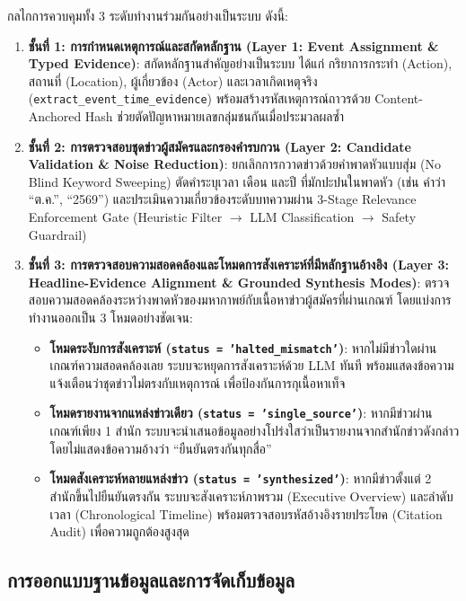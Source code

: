 กลไกการควบคุมทั้ง 3 ระดับทำงานร่วมกันอย่างเป็นระบบ ดังนี้:
\begin{enumerate}
    \item \textbf{ชั้นที่ 1: การกำหนดเหตุการณ์และสกัดหลักฐาน (Layer 1: Event Assignment \& Typed Evidence)}: สกัดหลักฐานสำคัญอย่างเป็นระบบ ได้แก่ กริยาการกระทำ (Action), สถานที่ (Location), ผู้เกี่ยวข้อง (Actor) และเวลาเกิดเหตุจริง (\texttt{extract\_event\_time\_evidence}) พร้อมสร้างรหัสเหตุการณ์ถาวรด้วย Content-Anchored Hash ช่วยตัดปัญหาหมายเลขกลุ่มชนกันเมื่อประมวลผลซ้ำ
    \item \textbf{ชั้นที่ 2: การตรวจสอบชุดข่าวผู้สมัครและกรองคำรบกวน (Layer 2: Candidate Validation \& Noise Reduction)}: ยกเลิกการกวาดข่าวด้วยคำพาดหัวแบบสุ่ม (No Blind Keyword Sweeping) ตัดคำระบุเวลา เดือน และปี ที่มักปะปนในพาดหัว (เช่น คำว่า ``ต.ค.'', ``2569'') และประเมินความเกี่ยวข้องระดับบทความผ่าน 3-Stage Relevance Enforcement Gate (Heuristic Filter $\rightarrow$ LLM Classification $\rightarrow$ Safety Guardrail)
    \item \textbf{ชั้นที่ 3: การตรวจสอบความสอดคล้องและโหมดการสังเคราะห์ที่มีหลักฐานอ้างอิง (Layer 3: Headline-Evidence Alignment \& Grounded Synthesis Modes)}: ตรวจสอบความสอดคล้องระหว่างพาดหัวของมหากาพย์กับเนื้อหาข่าวผู้สมัครที่ผ่านเกณฑ์ โดยแบ่งการทำงานออกเป็น 3 โหมดอย่างชัดเจน:
    \begin{itemize}
        \item \textbf{โหมดระงับการสังเคราะห์ (\texttt{status = 'halted\_mismatch'})}: หากไม่มีข่าวใดผ่านเกณฑ์ความสอดคล้องเลย ระบบจะหยุดการสังเคราะห์ด้วย LLM ทันที พร้อมแสดงข้อความแจ้งเตือนว่าชุดข่าวไม่ตรงกับเหตุการณ์ เพื่อป้องกันการกุเนื้อหาเท็จ
        \item \textbf{โหมดรายงานจากแหล่งข่าวเดียว (\texttt{status = 'single\_source'})}: หากมีข่าวผ่านเกณฑ์เพียง 1 สำนัก ระบบจะนำเสนอข้อมูลอย่างโปร่งใสว่าเป็นรายงานจากสำนักข่าวดังกล่าว โดยไม่แสดงข้อความอ้างว่า ``ยืนยันตรงกันทุกสื่อ''
        \item \textbf{โหมดสังเคราะห์หลายแหล่งข่าว (\texttt{status = 'synthesized'})}: หากมีข่าวตั้งแต่ 2 สำนักขึ้นไปยืนยันตรงกัน ระบบจะสังเคราะห์ภาพรวม (Executive Overview) และลำดับเวลา (Chronological Timeline) พร้อมตรวจสอบรหัสอ้างอิงรายประโยค (Citation Audit) เพื่อความถูกต้องสูงสุด
    \end{itemize}
\end{enumerate}

\subsection{การออกแบบฐานข้อมูลและการจัดเก็บข้อมูล}

